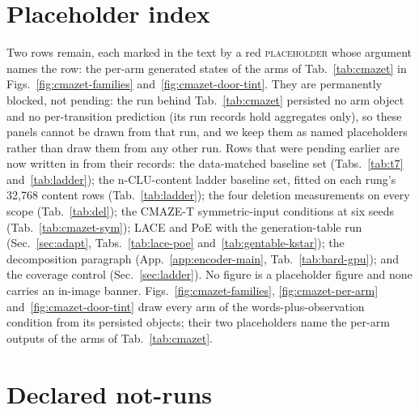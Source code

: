 \documentclass{article} %
\begin{document}
\section{Placeholder index}
\label{app:placeholders}

Two rows remain, each marked in the text by a red \textsc{placeholder} whose argument names
the row: the per-arm generated states of the arms of Tab.~\ref{tab:cmazet} in
Figs.~\ref{fig:cmazet-families} and~\ref{fig:cmazet-door-tint}. They are
permanently blocked, not pending: the run behind Tab.~\ref{tab:cmazet} persisted no arm object and
no per-transition prediction (its run records hold aggregates only), so these panels cannot be drawn
from that run, and we keep them as named placeholders rather than draw them from any other run. Rows
that were pending earlier are now written in from their records: the data-matched baseline set
(Tabs.~\ref{tab:t7} and~\ref{tab:ladder}); the n-CLU-content ladder baseline set, fitted on each rung's
32,768 content rows (Tab.~\ref{tab:ladder}); the four deletion measurements on every scope %
(Tab.~\ref{tab:del}); the CMAZE-T symmetric-input conditions at six seeds
(Tab.~\ref{tab:cmazet-sym}); LACE and PoE with the generation-table run (Sec.~\ref{sec:adapt},
Tabs.~\ref{tab:lace-poe} and~\ref{tab:gentable-kstar}); the decomposition paragraph
(App.~\ref{app:encoder-main}, Tab.~\ref{tab:bard-gpu}); and the coverage control
(Sec.~\ref{sec:ladder}). No figure is a placeholder figure and none carries an in-image banner.
Figs.~\ref{fig:cmazet-families}, \ref{fig:cmazet-per-arm}
and~\ref{fig:cmazet-door-tint} draw every arm of the words-plus-observation condition from its
persisted objects; their two placeholders name the per-arm outputs of the arms of
Tab.~\ref{tab:cmazet}.

\section{Declared not-runs}
\label{app:notrun}
\end{document}
